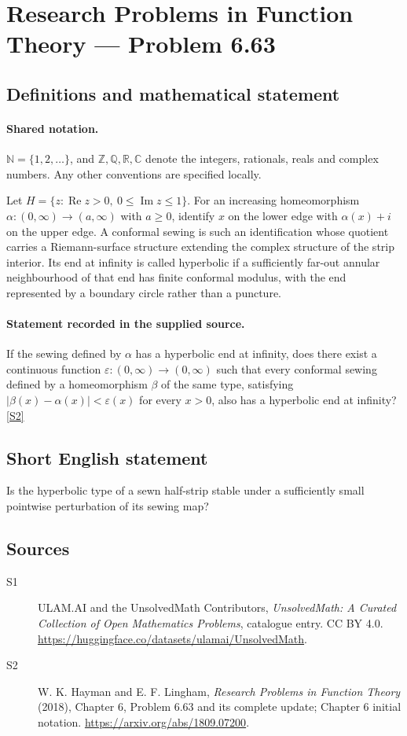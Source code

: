 \documentclass[11pt]{article}
\newcommand{\sref}[2]{\hyperlink{source:#1:#2}{[S#2]}}
\begin{document}
\section{Research Problems in Function Theory — Problem 6.63}\label{statement}

\subsection{Definitions and mathematical statement}

\paragraph{Shared notation.}$\mathbb N=\{1,2,\ldots\}$, and $\mathbb Z,\mathbb Q,\mathbb R,\mathbb C$ denote the integers, rationals, reals and complex numbers. Any other conventions are specified locally.


Let $H=\{z:\operatorname{Re}z>0,\ 0\le\operatorname{Im}z\le1\}$. For an increasing homeomorphism $\alpha:(0,\infty)\to(a,\infty)$ with $a\ge0$, identify $x$ on the lower edge with $\alpha(x)+i$ on the upper edge. A conformal sewing is such an identification whose quotient carries a Riemann-surface structure extending the complex structure of the strip interior. Its end at infinity is called hyperbolic if a sufficiently far-out annular neighbourhood of that end has finite conformal modulus, with the end represented by a boundary circle rather than a puncture.
\paragraph{Statement recorded in the supplied source.}
If the sewing defined by $\alpha$ has a hyperbolic end at infinity, does there exist a continuous function $\varepsilon:(0,\infty)\to(0,\infty)$ such that every conformal sewing defined by a homeomorphism $\beta$ of the same type, satisfying $|\beta(x)-\alpha(x)|<\varepsilon(x)$ for every $x>0$, also has a hyperbolic end at infinity? \sref{statement}{2}
\subsection{Short English statement}
Is the hyperbolic type of a sewn half-strip stable under a sufficiently small pointwise perturbation of its sewing map?
\subsection{Sources}
\begin{description}
\item[\hypertarget{source:statement:1}{S1}] ULAM.AI and the UnsolvedMath Contributors, \emph{UnsolvedMath: A Curated Collection of Open Mathematics Problems}, catalogue entry. CC BY 4.0. \url{https://huggingface.co/datasets/ulamai/UnsolvedMath}.
\item[\hypertarget{source:statement:2}{S2}] W. K. Hayman and E. F. Lingham, \emph{Research Problems in Function Theory} (2018), Chapter 6, Problem 6.63 and its complete update; Chapter 6 initial notation. \url{https://arxiv.org/abs/1809.07200}.
\end{description}
\label{end:statement}
\end{document}
